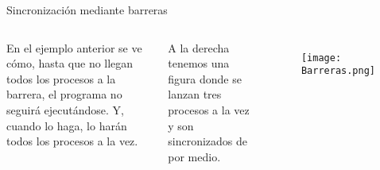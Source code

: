 \documentclass{beamer}
\begin{document}
\begin{frame}{Sincronización mediante barreras}

\begin{columns}
	En el ejemplo anterior se ve cómo, hasta que no llegan todos los procesos a la barrera, el programa no seguirá ejecutándose. Y, cuando lo haga, lo harán todos los procesos a la vez.
	
	\vspace{0.5cm}
	A la derecha tenemos una figura donde se lanzan tres procesos a la vez y son sincronizados de por medio.
	\begin{figure}[h]
		\centering
		\texttt{[image: Barreras.png]}
	\end{figure}
\end{columns}
\end{frame}
\end{document}
